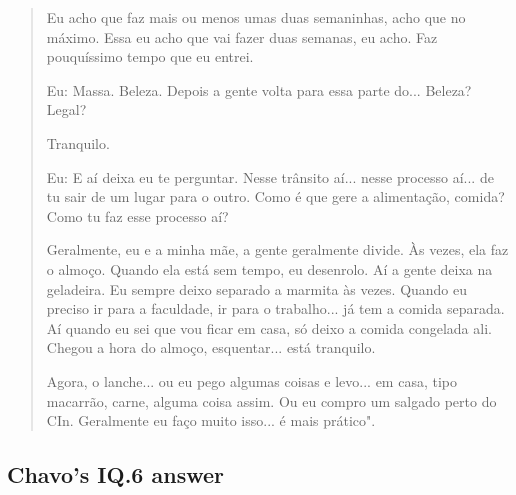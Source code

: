 \begin{quote}
    Eu acho que faz mais ou menos umas duas semaninhas, acho que no máximo. Essa eu acho que vai fazer duas semanas, eu acho. Faz pouquíssimo tempo que eu entrei.

    \colorbox{black!15}{Eu: Massa. Beleza. Depois a gente volta para essa parte do... Beleza? Legal?}
    
    Tranquilo.
    
    \colorbox{black!15}{Eu: E aí deixa eu te perguntar. Nesse trânsito aí... nesse processo aí... de tu sair} \colorbox{black!15}{de um lugar para o outro. Como é que gere a alimentação, comida? Como tu faz} \colorbox{black!15}{esse processo aí?}
    
    Geralmente, eu e a minha mãe, a gente geralmente divide. Às vezes, ela faz o almoço. Quando ela está sem tempo, eu desenrolo. Aí a gente deixa na geladeira. Eu sempre deixo separado a marmita às vezes. Quando eu preciso ir para a faculdade, ir para o trabalho... já tem a comida separada. Aí quando eu sei que vou ficar em casa, só deixo a comida congelada ali. Chegou a hora do almoço, esquentar... está tranquilo. 
    
    Agora, o lanche... ou eu pego algumas coisas e levo... em casa, tipo macarrão, carne, alguma coisa assim. Ou eu compro um salgado perto do \gls{CIn}. Geralmente eu faço muito isso... é mais prático".
\end{quote}

\subsection{Chavo’s IQ.6 answer}
\label{interview-exc-ss:chavo-iq6}

